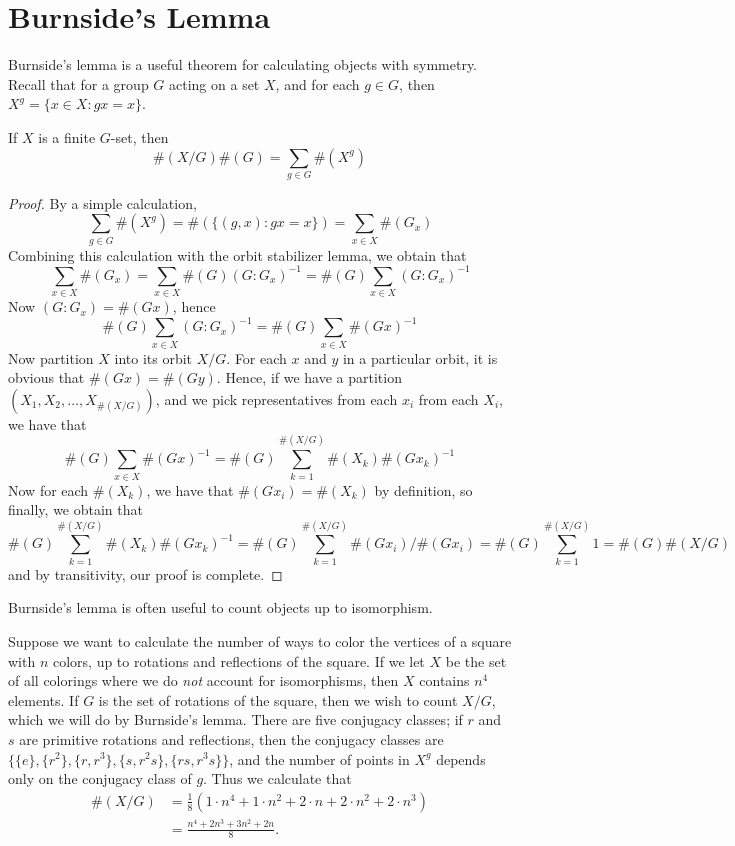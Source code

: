 \section{Burnside's Lemma}

Burnside's lemma is a useful theorem for calculating objects with symmetry. Recall that for a group $G$ acting on a set $X$, and for each $g \in G$, then $X^g = \{ x \in X: gx = x \}$.

\begin{lemma} 
    If $X$ is a finite $G$-set, then
    \[ \#(X/G) \#(G) = \sum_{g \in G} \#(X^g) \]
\end{lemma}
\begin{proof}
    By a simple calculation,
    \[ \sum_{g \in G} \#(X^g) = \#(\{(g,x): gx = x\}) = \sum_{x \in X} \#(G_x) \]
    Combining this calculation with the orbit stabilizer lemma, we obtain that
    \[ \sum_{x \in X} \#(G_x) = \sum_{x \in X} \#(G) (G:G_x)^{-1} = \#(G) \sum_{x \in X} (G:G_x)^{-1} \]
    Now $(G:G_x) = \#(Gx)$, hence
    \[ \#(G) \sum_{x \in X} (G:G_x)^{-1} = \#(G) \sum_{x \in X} \#(Gx)^{-1} \]
    Now partition $X$ into its orbit $X/G$. For each $x$ and $y$ in a particular orbit, it is obvious that $\#(Gx) = \#(Gy)$. Hence, if we have a partition $(X_1, X_2, \dots, X_{\#(X/G)})$, and we pick representatives from each $x_i$ from each $X_i$, we have that
    \[ \#(G) \sum_{x \in X} \#(Gx)^{-1} = \#(G) \sum_{k = 1}^{\#(X/G)} \#(X_k) \#(Gx_k)^{-1} \]
    Now for each $\#(X_k)$, we have that $\#(Gx_i) = \#(X_k)$ by definition, so finally, we obtain that
    \[ \#(G) \sum_{k = 1}^{\#(X/G)} \#(X_k)\#(Gx_k)^{-1} = \#(G) \sum_{k = 1}^{\#(X/G)} \#(Gx_i)/\#(Gx_i) = \#(G) \sum_{k = 1}^{\#(X/G)} 1 = \#(G) \#(X/G) \]
    and by transitivity, our proof is complete.
\end{proof}

Burnside's lemma is often useful to count objects up to isomorphism.

\begin{example}
    Suppose we want to calculate the number of ways to color the vertices of a square with $n$ colors, up to rotations and reflections of the square. If we let $X$ be the set of all colorings where we do \emph{not} account for isomorphisms, then $X$ contains $n^4$ elements. If $G$ is the set of rotations of the square, then we wish to count $X/G$, which we will do by Burnside's lemma. There are five conjugacy classes; if $r$ and $s$ are primitive rotations and reflections, then the conjugacy classes are $\{ \{ e \}, \{ r^2 \}, \{ r, r^3 \}, \{ s, r^2s \}, \{ rs, r^3s \} \}$, and the number of points in $X^g$ depends only on the conjugacy class of $g$. Thus we calculate that
    \begin{align*}
        \#(X/G) &= \frac{1}{8} \left( 1 \cdot n^4 + 1 \cdot n^2 + 2 \cdot n + 2 \cdot n^2 + 2 \cdot n^3 \right)\\
        &= \frac{n^4 + 2n^3 + 3n^2 + 2n}{8}.
    \end{align*}
\end{example}

